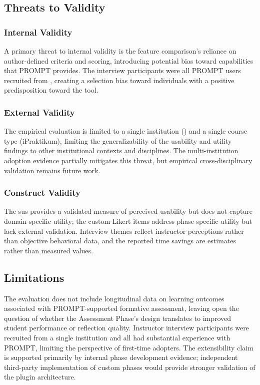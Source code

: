 \subsection{Threats to Validity}

\subsubsection{Internal Validity}

A primary threat to internal validity is the feature comparison's reliance on author-defined criteria and scoring, introducing potential bias toward capabilities that PROMPT provides.
The interview participants were all PROMPT users recruited from \university{}, creating a selection bias toward individuals with a positive predisposition toward the tool.

\subsubsection{External Validity}

The empirical evaluation is limited to a single institution (\university{}) and a single course type (iPraktikum), limiting the generalizability of the usability and utility findings to other institutional contexts and disciplines.
The multi-institution adoption evidence partially mitigates this threat, but empirical cross-disciplinary validation remains future work.

\subsubsection{Construct Validity}

The \acrshort{sus} provides a validated measure of perceived usability but does not capture domain-specific utility;
the custom Likert items address phase-specific utility but lack external validation.
Interview themes reflect instructor perceptions rather than objective behavioral data, and the reported time savings are estimates rather than measured values.

\subsection{Limitations}

The evaluation does not include longitudinal data on learning outcomes associated with PROMPT-supported formative assessment, leaving open the question of whether the Assessment Phase's design translates to improved student performance or reflection quality.
Instructor interview participants were recruited from a single institution and all had substantial experience with PROMPT, limiting the perspective of first-time adopters.
The extensibility claim is supported primarily by internal phase development evidence;
independent third-party implementation of custom phases would provide stronger validation of the plugin architecture.
